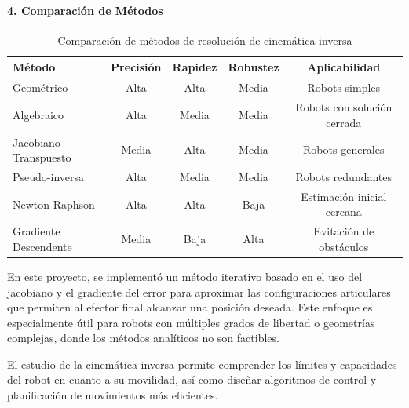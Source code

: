 \paragraph{4. Comparación de Métodos}

\begin{table}[H]
	\centering
	\begin{tabular}{|l|c|c|c|c|}
		\hline
		\textbf{Método} & \textbf{Precisión} & \textbf{Rapidez} & \textbf{Robustez} & \textbf{Aplicabilidad} \\
		\hline
		Geométrico & Alta & Alta & Media & Robots simples \\
		Algebraico & Alta & Media & Media & Robots con solución cerrada \\
		Jacobiano Transpuesto & Media & Alta & Media & Robots generales \\
		Pseudo-inversa & Alta & Media & Media & Robots redundantes \\
		Newton-Raphson & Alta & Alta & Baja & Estimación inicial cercana \\
		Gradiente Descendente & Media & Baja & Alta & Evitación de obstáculos \\
		\hline
	\end{tabular}
	\caption{Comparación de métodos de resolución de cinemática inversa}
\end{table}


En este proyecto, se implementó un método iterativo basado en el uso del jacobiano y el gradiente del error para aproximar las configuraciones articulares que permiten al efector final alcanzar una posición deseada. Este enfoque es especialmente útil para robots con múltiples grados de libertad o geometrías complejas, donde los métodos analíticos no son factibles.

El estudio de la cinemática inversa permite comprender los límites y capacidades del robot en cuanto a su movilidad, así como diseñar algoritmos de control y planificación de movimientos más eficientes.



